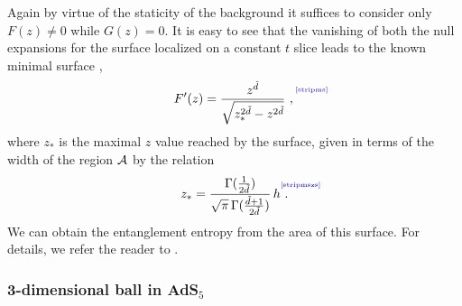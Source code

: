 \documentclass[12pt]{article}
\newcommand{\be}{\begin{equation}}
\newcommand{\ee}{\end{equation}}
\def\CA{{\cal A}}
\def\Label#1{\label{#1}%
{ \color{blue}{\smash{\hbox to0pt{\raise2ex\hbox{\tiny[#1]}\hss}}}}}
\def\rA{\CA}
\def\ti{\tilde}
\begin{document}
Again by virtue of the staticity of the background it suffices to consider
only $F(z) \neq 0$ while  $G(z) = 0$.
It is easy to see that the vanishing of both the  null expansions for the surface localized on a constant $t$ slice leads to the known minimal surface
\cite{Ryu:2006bv, Ryu:2006ef},
%
\be
F'(z) = {z^{\ti{d}} \over
\sqrt{z_*^{2\ti{d}} - z^{2\ti{d}}}} \ ,
\Label{stripms} \ee
%
where $z_*$ is the maximal $z$ value reached by the surface, given in terms of the width of the region $\rA$ by the relation
%
\be
z_*  = {\Gamma({1\over 2 \ti{d}} ) \over \sqrt{\pi} \, \Gamma({\ti{d}+1\over 2 \ti{d}} ) } \, h
\Label{stripmszs} \ . \ee
%
We can obtain the
entanglement entropy from the area of this surface. For details, we
refer the reader to \cite{Ryu:2006ef}.

\subsubsection{3-dimensional ball in AdS$_{5}$}
\end{document}
